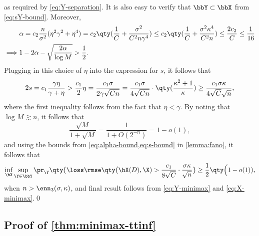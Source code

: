 \documentclass[10pt]{article}
\begin{document}
as required by \ref{eq:Y-separation}. It is also easy to verify that $\bbY \subset \bbX$ from \ref{eq:sY-bound}. Moreover,
\begin{align}
    &\alpha = c_2\frac{n}{\sigma^2}(\eta^2\gamma^2 + \eta^4) = c_2\qty(\frac{1}{C} + \frac{\sigma^2}{C^2n\gamma^4}) \le c_2\qty(\frac{1}{C} + \frac{\sigma^2\kappa^4}{C^2n}) \le \frac{2c_2}{C} \le \frac{1}{16}\\
    \implies & 1 - 2\alpha - \sqrt{\frac{2\alpha}{\log{M}}} > \frac{1}{2}.\label{eq:alpha-bound}
\end{align}
Plugging in this choice of $\eta$ into the expression for $s$, it follows that
\begin{align}
    2s 
    = c_1 \frac{\gamma\eta}{\gamma + \eta} 
    >\frac{c_1}{2} \eta
    = \frac{c_1\sigma}{2\gamma\sqrt{Cn}}
    = \frac{c_1\sigma}{4\sqrt{Cn}} \cdot \qty(\frac{\kappa^2 +1}{\kappa})
    \ge \frac{c_1\sigma\kappa}{4\sqrt{C}\sqrt{n}},\label{eq:s-bound}
\end{align}
where the first inequality follows from the fact that $\eta < \gamma$. By noting that $\log{M} \gtrsim n$, it follows that
$$
\frac{\sqrt{M}}{1+\sqrt{M}} = \frac{1}{1 + O(2^{-n})} = 1 - o(1),
$$ 
and using the bounds from \cref{eq:alpha-bound,eq:s-bound} in \cref{lemma:fano}, it follows that
\begin{align}
    \inf_{\hX}\sup_{\Y \in \bbY} \pr_{\Y}\qty{ \loss\rmse\qty\big(\hX(D), \X) > \frac{c_1}{8\sqrt{C}} \cdot \frac{\sigma\kappa}{\sqrt{n}} } \ge \frac{1}{2}\qty\Big(1 - o(1)),
\end{align}
when $n > \enn_3(\sigma, \kappa)$, and final result follows from \cref{eq:Y-minimax} and \cref{eq:X-minimax}.\qed



















\subsection{Proof of \cref{thm:minimax-ttinf}}
\label{proof:thm:minimax-ttinf}
\end{document}
